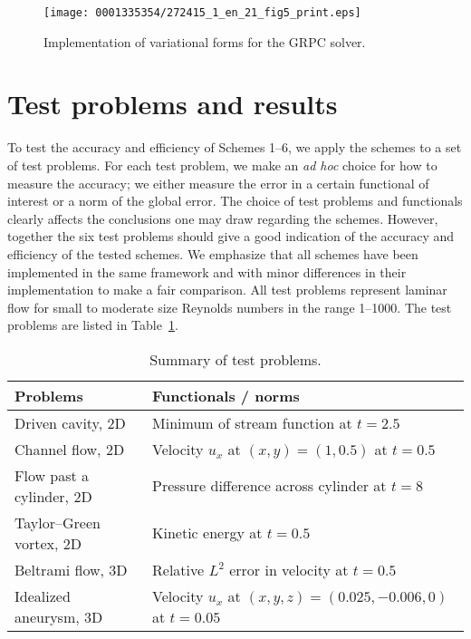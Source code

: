 \begin{figure}[!t]
\vspace*{12pt}
\centering
\texttt{[image: 0001335354/272415\_1\_en\_21\_fig5\_print.eps]}
    \caption{Implementation of variational forms for the GRPC solver.}
    \label{fig:grpc_code}
\end{figure}

\vspace*{5pt}
\section{Test problems and results}

To test the accuracy and efficiency of Schemes 1--6, we apply the
schemes to a set of test problems. For each test problem, we make an
\emph{ad hoc} choice for how to measure the accuracy; we either
measure the error in a certain functional of interest or a norm of the
global error.  The choice of test problems and functionals clearly
affects the conclusions one may draw regarding the schemes. However,
together the six test problems should give a good indication of the
accuracy and efficiency of the tested schemes. We emphasize that all
schemes have been implemented in the same framework and with minor
differences in their implementation to make a fair comparison. All
test problems represent laminar flow for small to moderate size
Reynolds numbers in the range 1--1000. The test problems are listed in
Table~\ref{tab:problems}.

\begin{table}
\linenumbersep-2.7pc
\centering
\begin{tabular}{ll}
\toprule
Problems & Functionals / norms \\
\midrule
Driven cavity, 2D        & Minimum of stream function at $t = 2.5$ \\
Channel flow, 2D         & Velocity $u_x$ at $(x, y) = (1, 0.5)$ at $t = 0.5$ \\
Flow past a cylinder, 2D & Pressure difference across cylinder at $t = 8$ \\
Taylor--Green vortex, 2D & Kinetic energy at $t = 0.5$ \\
Beltrami flow, 3D        & Relative $L^2$ error in velocity at $t = 0.5$ \\
Idealized aneurysm, 3D   & Velocity $u_x$ at $(x, y, z) = (0.025, -0.006, 0)$ at $t = 0.05$ \\
\bottomrule
\end{tabular}
\caption{Summary of test problems.}
\label{tab:problems}
\end{table}

